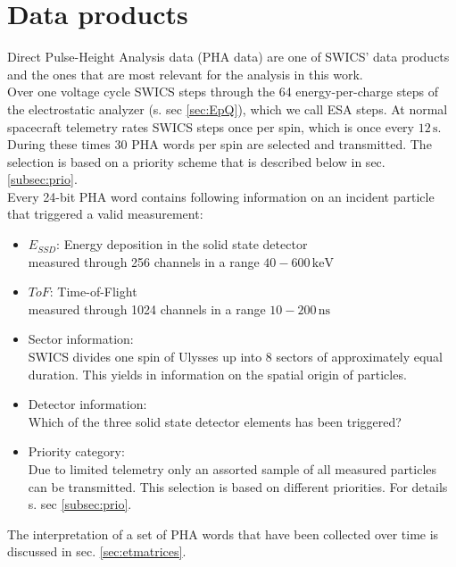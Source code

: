 \section{Data products}
\label{sec_dataprod}
Direct Pulse-Height Analysis data (PHA data) are one of SWICS' data products and the ones that are most relevant for the analysis in this work.\\
Over one voltage cycle SWICS steps through the 64 energy-per-charge steps of the electrostatic analyzer (s. sec \ref{sec:EpQ}), which we call ESA steps. At normal spacecraft telemetry rates SWICS steps once per spin, which is once every $12\,\mathrm{s}$. During these times 30 PHA words per spin are selected and transmitted. The selection is based on a priority scheme that is described below in sec. \ref{subsec:prio}.\\
Every 24-bit PHA word contains following information on an incident particle that triggered a valid measurement:
\begin{itemize}
	\item $E_{SSD}$: Energy deposition in the solid state detector \\
	measured through 256 channels in a range $40 - 600\,\mathrm{keV}$
	\item $ToF$: Time-of-Flight\\
	measured through 1024 channels in a range $10 - 200\,\mathrm{ns}$
	\item Sector information:\\
	SWICS divides one spin of Ulysses up into 8 sectors of approximately equal duration. This yields in information on the spatial origin of particles.
	\item Detector information: \\
	Which of the three solid state detector elements has been triggered?
	\item Priority category: \\
	Due to limited telemetry only an assorted sample of all measured particles can be transmitted. This selection is based on different priorities. For details s. sec \ref{subsec:prio}.
\end{itemize}
The interpretation of a set of PHA words that have been collected over time is discussed in sec. \ref{sec:etmatrices}. 
%
